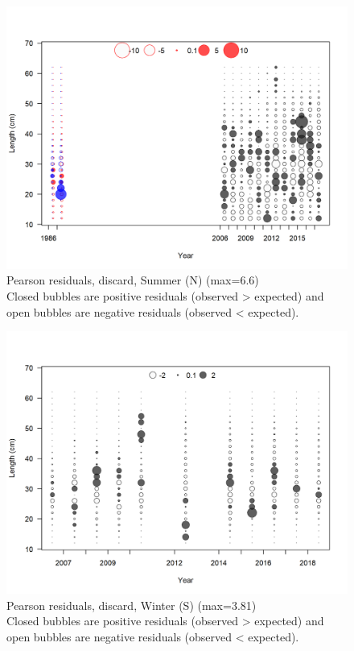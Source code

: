 \documentclass[12pt,]{article}
\begin{document}
\begin{figure}
\centering
\includegraphics{r4ss/plots_mod1/comp_lenfit_residsflt2mkt1.png}
\caption{Pearson residuals, discard, Summer (N) (max=6.6)\\
Closed bubbles are positive residuals (observed \textgreater{} expected)
and open bubbles are negative residuals (observed \textless{} expected).
\label{fig:discard_sn_len_pearson}}
\end{figure}

\begin{figure}
\centering
\includegraphics{r4ss/plots_mod1/comp_lenfit_residsflt3mkt1.png}
\caption{Pearson residuals, discard, Winter (S) (max=3.81)\\
Closed bubbles are positive residuals (observed \textgreater{} expected)
and open bubbles are negative residuals (observed \textless{} expected).
\label{fig:discard_ws_len_pearson}}
\end{figure}
\end{document}
